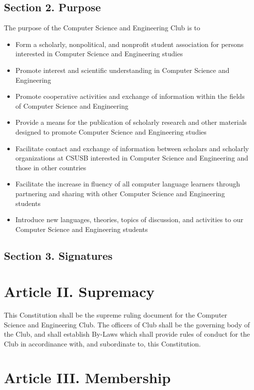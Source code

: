 \documentclass{article}
\begin{document}
  \subsection{Section 2. Purpose}
    The purpose of the Computer Science and Engineering Club is to
    \begin{itemize}
      \item Form a scholarly, nonpolitical, and nonprofit student association for persons interested in Computer Science and Engineering studies
      \item Promote interest and scientific understanding in Computer Science and Engineering
      \item Promote cooperative activities and exchange of information within the fields of Computer Science and Engineering
      \item Provide a means for the publication of scholarly research and other materials designed to promote Computer Science and Engineering studies
      \item Facilitate contact and exchange of information between scholars and scholarly organizations at CSUSB interested in Computer Science and Engineering and those in other countries
      \item Facilitate the increase in fluency of all computer language learners through partnering and sharing with other Computer Science and Engineering students
      \item Introduce new languages, theories, topics of discussion, and activities to our Computer Science and Engineering students
    \end{itemize}

  \subsection{Section 3. Signatures}
  \newpage

\section{Article II. Supremacy}
  This Constitution shall be the supreme ruling document for the Computer Science and Engineering Club. The officers of Club shall be the governing body of the Club, and shall establish By-Laws which shall provide rules of conduct for the Club in accordinance with, and subordinate to, this Constitution.

\section{Article III. Membership}
\end{document}

